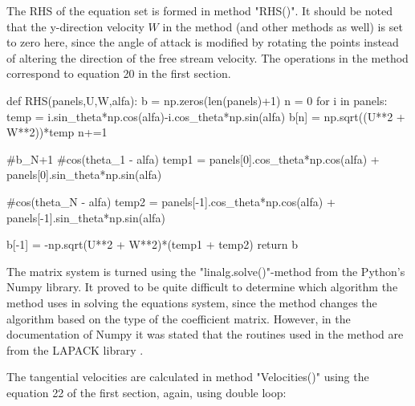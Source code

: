 \documentclass[a4paper,12pt]{article}
\begin{document}
The RHS of the equation set is formed in method "RHS()". It should be noted that the y-direction velocity  $W$ in the method (and other methods as well) is set to zero here, since the angle of attack is modified by rotating the points instead of altering the direction of the free stream velocity. The operations in the method correspond to equation 20 in the first section.
\begin{python}
def RHS(panels,U,W,alfa):
        b = np.zeros(len(panels)+1)
        n = 0
        for i in panels:
                temp = i.sin_theta*np.cos(alfa)-i.cos_theta*np.sin(alfa)
                b[n] = np.sqrt((U**2 + W**2))*temp
                n+=1

        #b_N+1                
        #cos(theta_1 - alfa)
        temp1 = panels[0].cos_theta*np.cos(alfa) + panels[0].sin_theta*np.sin(alfa)

        #cos(theta_N - alfa)
        temp2 = panels[-1].cos_theta*np.cos(alfa) + panels[-1].sin_theta*np.sin(alfa)
        
        b[-1] = -np.sqrt(U**2 + W**2)*(temp1 + temp2)
        return b
\end{python}
The matrix system is turned using the "linalg.solve()"-method from the Python's Numpy library. It proved to be quite difficult to determine which algorithm the method uses in solving the equations system, since the method changes the algorithm based on the type of the coefficient matrix. However, in the documentation of Numpy it was stated that the routines used in the method are from the LAPACK library \cite{laug}.

The tangential velocities are calculated in method "Velocities()" using the equation 22 of the first section, again, using double loop:
\end{document}
